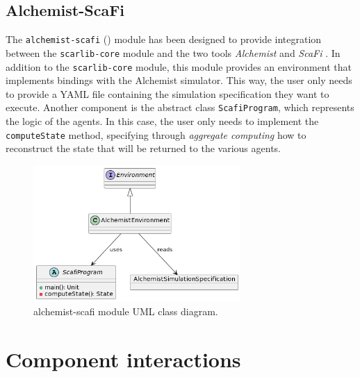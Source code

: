 \documentclass[12pt,a4paper,openright,twoside]{book}
\begin{document}
\subsection*{Alchemist-ScaFi}

The \texttt{alchemist-scafi} () module has been designed to provide integration between the \texttt{scarlib-core} module 
    and the two tools \emph{Alchemist} \cite{alchemist} and \emph{ScaFi} \cite{casadei2022scafi}. 
    In addition to the \texttt{scarlib-core} module, this module provides an environment that implements bindings 
    with the Alchemist simulator. This way, the user only needs to provide a YAML file containing the 
    simulation specification they want to execute. 
    Another component is the abstract class \texttt{ScafiProgram}, which represents the logic of the agents. 
    In this case, the user only needs to implement the \texttt{computeState} method, specifying through \emph{aggregate 
    computing} how to reconstruct the state that will be returned to the various agents.

\begin{figure}[t]
    \centering
    \includegraphics[width=0.7\textwidth]{figures/alchemist-scafi-uml.png}
    \caption{alchemist-scafi module UML class diagram.}
    \label{fig:alchemist-scafi}
\end{figure}

\section{Component interactions}
\end{document}
